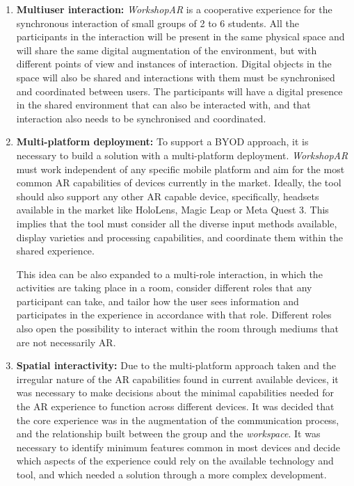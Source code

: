 \begin{enumerate}
    \item \textbf{Multiuser interaction:} \emph{WorkshopAR} is a cooperative experience for the synchronous interaction of small groups of 2 to 6 students. All the
    participants in the interaction will be present in the same physical space and will share the same digital augmentation of the environment, but with different points
    of view and instances of interaction. Digital objects in the space will also be shared and interactions with them must be synchronised and coordinated between users.
    The participants will have a digital presence in the shared environment that can also be interacted with, and that interaction also needs to be synchronised and
    coordinated.
    \item \textbf{Multi-platform deployment:} To support a \ac{BYOD} approach, it is necessary to build a solution with a multi-platform deployment. \emph{WorkshopAR} must
    work independent of any specific mobile platform and aim for the most common \ac{AR} capabilities of devices currently in the market. Ideally, the tool should also
    support any other \ac{AR} capable device, specifically, headsets available in the market like HoloLens, Magic Leap or Meta Quest 3. This implies that the tool must
    consider all the diverse input methods available, display varieties and processing capabilities, and coordinate them within the shared experience.

    This idea can be also expanded to a multi-role interaction, in which the activities are taking place in a room, consider different roles that any participant can take,
    and tailor how the user sees information and participates in the experience in accordance with that role. Different roles also open the possibility to interact within
    the room through mediums that are not necessarily \ac{AR}.
    \item \textbf{Spatial interactivity:} Due to the multi-platform approach taken and the irregular nature of the \ac{AR} capabilities found in current available devices,
    it was necessary to make decisions about the minimal capabilities needed for the \ac{AR} experience to function across different devices. It was decided that the core
    experience was in the augmentation of the communication process, and the relationship built between the group and the \emph{workspace}. It was necessary to identify minimum
    features common in most devices and decide which aspects of the experience could rely on the available technology and tool, and which needed a solution through a more
    complex development.
\end{enumerate}

